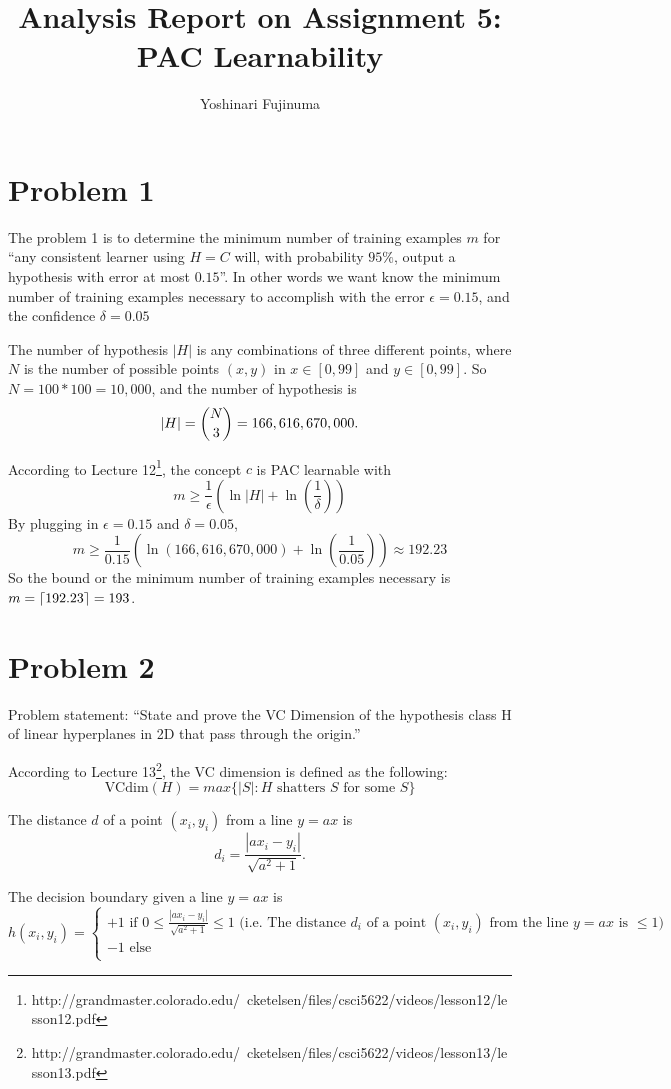 \documentclass[11pt]{article}
\DeclarePairedDelimiter\ceil{\lceil}{\rceil}
\begin{document}
\title{Analysis Report on Assignment 5: PAC Learnability}
\author{Yoshinari Fujinuma}
\date{}
\maketitle

\section{Problem 1}
The problem 1 is to determine the minimum number of training examples $m$ for ``any consistent learner using $H=C$ will, with probability $95\%$, output a hypothesis with error at most $0.15$''. In other  words we want know the minimum number of training examples necessary to accomplish with the error $\epsilon = 0.15$, and the confidence $\delta = 0.05$

The number of hypothesis $|H|$ is any combinations of three different points, where $N$ is the number of possible points $(x, y)$ in $x \in [0, 99]$ and $y \in [0, 99]$. So $N = 100 * 100 = 10,000$, and the number of hypothesis is
$$
|H| = \dbinom{N}{3} = 166,616,670,000.
$$

According to Lecture 12\footnote{http://grandmaster.colorado.edu/~cketelsen/files/csci5622/videos/lesson12/lesson12.pdf}, the concept $c$ is PAC learnable with 
$$
m \geq \frac{1}{\epsilon}(\ln |H| + \ln(\frac{1}{\delta}))
$$
By plugging in $\epsilon = 0.15$ and $\delta = 0.05$, 
$$
m \geq \frac{1}{0.15}(\ln(166,616,670,000) + \ln(\frac{1}{0.05})) \approx 192.23
$$
So the bound or the minimum number of training examples necessary is $m = \ceil{192.23} = 193$.


\section{Problem 2}
Problem statement: ``State and prove the VC Dimension of the hypothesis class H of linear hyperplanes in 2D that pass through the origin.''

According to Lecture 13\footnote{http://grandmaster.colorado.edu/~cketelsen/files/csci5622/videos/lesson13/lesson13.pdf}, the VC dimension is defined as the following:
$$
\mbox{VCdim}(H) = max\{|S|: H \mbox{ shatters } S \mbox{ for some } S\}
$$

The distance $d$ of a point $(x_i, y_i)$ from a line $y = ax$ is
$$
d_i = \frac{|ax_i - y_i|}{\sqrt{a^2 + 1}}.
$$

The decision boundary given a line $y = ax$ is
$$ 
h(x_i, y_i) = \begin{cases} 
          +1 \mbox{ if } 0 \leq \frac{|ax_i - y_i|}{\sqrt{a^2 + 1}} \leq 1 \mbox{ (i.e. The distance $d_i$ of a point $(x_i, y_i)$ from the line $y = ax$ is $\leq 1$) }\\
          -1 \mbox{ else }\\
\end{cases}
$$
\end{document}
